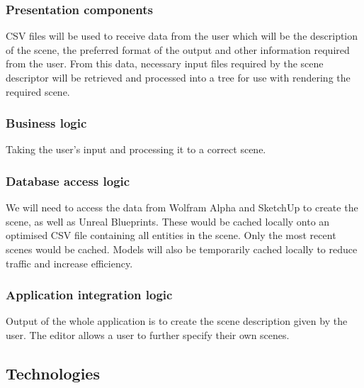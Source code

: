 \documentclass[a4paper,12pt]{article}
\begin{document}
\subsubsection{Presentation components}
CSV files will be used to receive data from the user which will be the description of the scene, the preferred format of the output and other information required from the user. From this data, necessary input files required by the scene descriptor will be retrieved and processed into a tree for use with rendering the required scene.

\subsubsection{Business logic}
Taking the user's input and processing it to a correct scene.

\subsubsection{Database access logic}
We will need to access the data from Wolfram Alpha and SketchUp to create the scene, as well as Unreal Blueprints. These would be cached locally onto an optimised CSV file containing all entities in the scene. Only the most recent scenes would be cached. Models will also be temporarily cached locally to reduce traffic and increase efficiency.

\subsubsection{Application integration logic}
Output of the whole application is to create the scene description given by the user. The editor allows a user to further specify their own scenes.


\subsection{Technologies}
\end{document}
